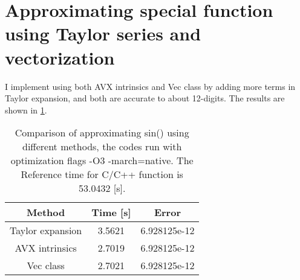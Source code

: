 \documentclass[10pt,a4paper]{article}
\theoremstyle{dotlessP}
\begin{document}
 \section{Approximating special function using Taylor series and vectorization}
 I implement using both AVX intrinsics and Vec class by adding more terms in Taylor expansion, and both are accurate to about 12-digits. The results are shown in \cref{tab:Taylor}.
 
 	\begin{table}[tbhp] 
 	{\footnotesize
 		\caption{Comparison of approximating sin() using different methods, the codes run with optimization flags -O3 -march=native. The Reference time for C/C++ function is  53.0432 [s].
 		}\label{tab:Taylor}
 		\begin{center}
\begin{tabular}{|c|c|c|}
	\hline 
Method	& Time [s] &  Error\\ 
	\hline 
Taylor expansion	&  3.5621 & 6.928125e-12 \\ \hline 
AVX intrinsics &  2.7019 & 	6.928125e-12\\ \hline 
Vec class&  2.7021   & 	 6.928125e-12\\ \hline 
\end{tabular} 
 		\end{center}
 	}
 \end{table}
 
\end{document}
